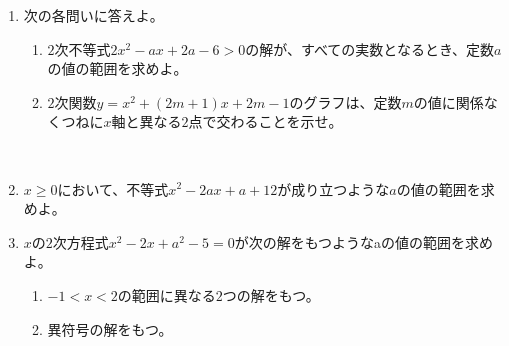 \documentclass[10pt,a4paper,fleqn]{jsarticle}
\begin{document}
\begin{enumerate}
\item 次の各問いに答えよ。
\begin{enumerate}
\item $2$次不等式$2x^2-ax+2a-6>0$の解が、すべての実数となるとき、定数$a$の値の範囲を求めよ。
\item $2$次関数$y=x^2+(2m+1)x+2m-1$のグラフは、定数$m$の値に関係なくつねに$x$軸と異なる$2$点で交わることを示せ。
\end{enumerate}\

\item $x\geq 0 $において、不等式$x^2-2ax+a+12$が成り立つような$a$の値の範囲を求めよ。\newline

\item $x$の$2$次方程式$x^2-2x+a^2-5=0$が次の解をもつようなaの値の範囲を求めよ。
\begin{enumerate}
\item $-1<x<2$の範囲に異なる$2$つの解をもつ。
\item 異符号の解をもつ。
\end{enumerate}

\end{enumerate}
\end{document}
